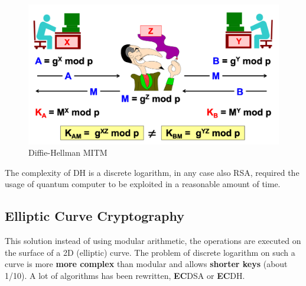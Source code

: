 \documentclass[12pt]{article}
\begin{document}
\begin{figure}[H]
   \centering
   \includegraphics[width=\linewidth]{images/dh_mitm.png}
   \caption{Diffie-Hellman MITM}
   \label{fig:dh_mitm}
\end{figure}

The complexity of DH is a discrete logarithm, in any case also RSA, required the usage of quantum computer to be exploited in a reasonable amount of time.

\subsection{Elliptic Curve Cryptography}
This solution instead of using modular arithmetic, the operations are executed on the surface of a 2D (elliptic) curve. The problem of discrete logarithm on such a curve is more \textbf{more complex} than modular and allows \textbf{shorter keys} (about 1/10). A lot of algorithms has been rewritten, \textbf{EC}DSA or \textbf{EC}DH.\\
\end{document}
